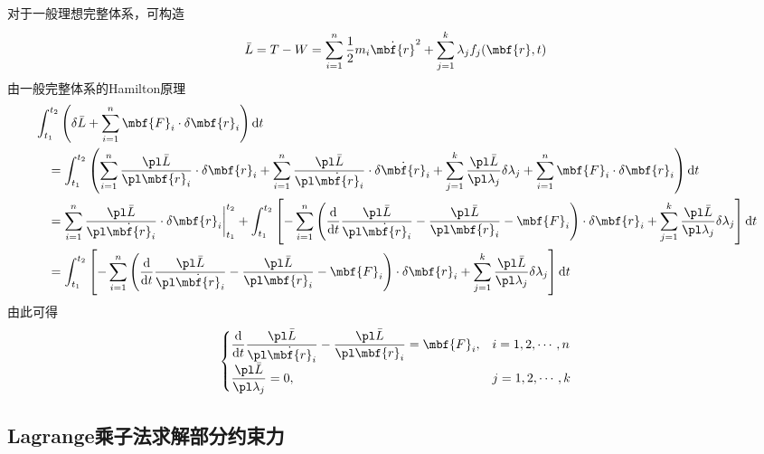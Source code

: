 对于一般理想完整体系，可构造
\begin{equation}
	\bar{L} = T- W = \sum_{i=1}^n \frac12 m_i \dot{\mbf{r}}^2 + \sum_{j=1}^k \lambda_j f_j(\mbf{r},t)
\end{equation}
由一般完整体系的Hamilton原理
\begin{align*}
	& \int_{t_1}^{t_2} \left(\delta \bar{L} + \sum_{i=1}^n \mbf{F}_i \cdot \delta \mbf{r}_i\right) \mathrm{d} t \\
	& \quad = \int_{t_1}^{t_2} \left(\sum_{i=1}^n \frac{\pl \bar{L}}{\pl \mbf{r}_i} \cdot \delta \mbf{r}_i + \sum_{i=1}^n \frac{\pl \bar{L}}{\pl \dot{\mbf{r}}_i} \cdot \delta \dot{\mbf{r}}_i + \sum_{j=1}^k \frac{\pl \bar{L}}{\pl \lambda_j} \delta \lambda_j + \sum_{i=1}^n \mbf{F}_i \cdot \delta \mbf{r}_i \right) \mathrm{d} t \\
	& \quad = \sum_{i=1}^n \frac{\pl \bar{L}}{\pl \dot{\mbf{r}}_i} \cdot \delta \mbf{r}_i \bigg|_{t_1}^{t_2} + \int_{t_1}^{t_2} \left[-\sum_{i=1}^n \left(\frac{\mathrm{d}}{\mathrm{d} t} \frac{\pl \bar{L}}{\pl \dot{\mbf{r}}_i} - \frac{\pl \bar{L}}{\pl \mbf{r}_i} - \mbf{F}_i\right) \cdot \delta \mbf{r}_i + \sum_{j=1}^k \frac{\pl \bar{L}}{\pl \lambda_j} \delta \lambda_j\right] \mathrm{d} t \\
	& \quad = \int_{t_1}^{t_2} \left[-\sum_{i=1}^n \left(\frac{\mathrm{d}}{\mathrm{d} t} \frac{\pl \bar{L}}{\pl \dot{\mbf{r}}_i} - \frac{\pl \bar{L}}{\pl \mbf{r}_i} - \mbf{F}_i\right) \cdot \delta \mbf{r}_i + \sum_{j=1}^k \frac{\pl \bar{L}}{\pl \lambda_j} \delta \lambda_j\right] \mathrm{d} t
\end{align*}
由此可得
\begin{equation}
	\begin{cases}
		\displaystyle \frac{\mathrm{d}}{\mathrm{d} t} \frac{\pl \bar{L}}{\pl \dot{\mbf{r}}_i} - \frac{\pl \bar{L}}{\pl \mbf{r}_i} = \mbf{F}_i,& i=1,2,\cdots,n \\[1.5ex]
		\displaystyle \frac{\pl \bar{L}}{\pl \lambda_j} = 0,& j = 1,2,\cdots,k
	\end{cases}
\end{equation}

\subsection{Lagrange乘子法求解部分约束力}

